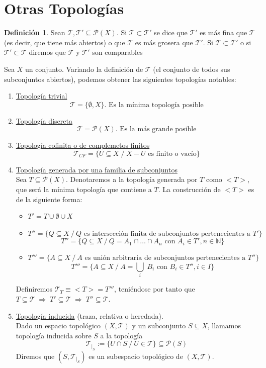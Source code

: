\documentclass[12pt,twoside]{report}
\newcommand\mc[1]{\mathcal{#1}}
\theoremstyle{azul}
\theoremstyle{azul2}
\theoremstyle{plain}
\theoremstyle{definition}
\newtheorem*{defi}{Definición}
\theoremstyle{remark}
\begin{document}
\section{Otras Topologías}

\begin{defi}
Sean  $\mc{T} , \mc{T}'  \subseteq \mathcal{P}(X)$. Si $\mc{T} \subset \mc{T}'$ se dice que $\mc{T}'$ es más fina que $\mc{T}$ (es decir, que tiene más abiertos) o que $\mc{T}$ es más grosera que $\mc{T}'$. Si $\mc{T}\subset\mc{T'}$ o si $\mc{T'}\subset\mc{T}$ diremos que $\mc{T}$ y $\mc{T'}$ son comparables
\end{defi}
Sea $X$ un conjunto. Variando la definición de $\mc{T}$ (el conjunto de todos sus subconjuntos abiertos), podemos obtener las siguientes topologías notables:
\begin{enumerate}

    \item \underline{Topología trivial}
    $$\mc{T}=\{ \emptyset, X \} \text{. Es la mínima topología posible}$$
    \item \underline{Topología discreta}
    $$\mc{T}=\mathcal{P}(X) \text{. Es la más grande posible}$$
    \item \underline{Topología cofinita o de complemetos finitos}
    $$\mc{T}_{CF}=\{ U \subseteq X \; / \; X-U \text{ es finito o vacío}\}$$
    \item \underline{Topología generada por una familia de subconjuntos} \\ \label{topunion}
    Sea $T \subseteq \mc{P}(X)$. Denotaremos a la topología generada por $T$ como $<T>$, que será la mínima topología que contiene a $T$. La construcción de $<T>$ es de la siguiente forma:
    \begin{itemize}
        \item $T'=T \cup \emptyset \cup X$ 
        \item $T''=\{ Q \subseteq X \: / \: Q \text{ es intersección finita de subconjuntos pertenecientes a } T'\}$ $$T'' = \{ Q \subseteq X \: / \: Q=A_1 \cap \ldots \cap A_n \text{ con } A_i \in T', n \in \mathbb{N}\}$$
        \item $T'''=\{ A \subseteq X \: / \: A \text{ es unión arbitraria de subconjuntos pertenecientes a } T''\}$ $$T'''=\{ A \subseteq X \: / \: A = \underset{i}{\bigcup} \; B_i \text{ con } B_i \in T'', i \in I\}$$ 
    \end{itemize}
    Definiremos $\mc{T}_T \equiv <T> = T'''$, teniéndose por tanto que $T \subseteq \mc{T} \; \Rightarrow \; T' \subseteq \mc{T} \; \Rightarrow \;  T'' \subseteq \mc{T}$.
    \item \underline{Topología inducida} (traza, relativa o heredada). \\
    Dado un espacio topológico $(X, \mc{T})$ y un subconjunto $S \subseteq X$, llamamos topología inducida sobre $S$ a la topología 
    $$\mc{T}_{|_S} := \{U \cap S \: / \: U \in \mc{T}\} \subseteq \mc{P}(S)$$
    Diremos que $(S,\mc{T}_{|_S} )$ es un subespacio topológico de $(X, \mc{T})$.
    

\end{enumerate}
\end{document}

